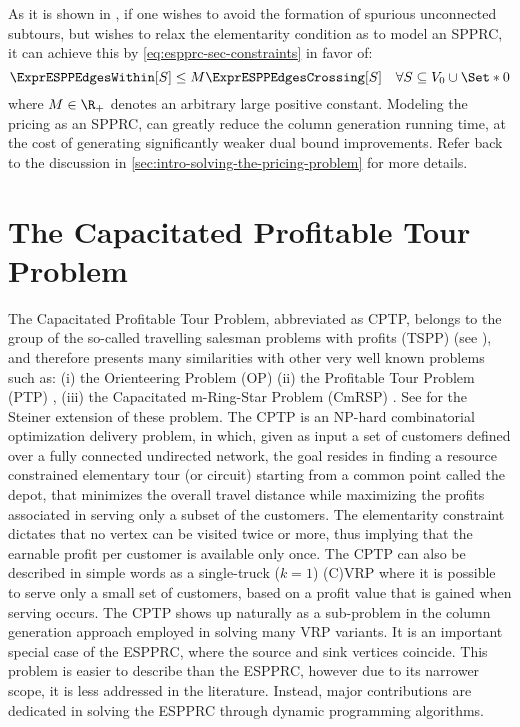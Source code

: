 As it is shown in \textcite{beasley1989},
if one wishes to avoid the formation of spurious unconnected subtours,
but wishes to relax the elementarity condition as to model an SPPRC,
it can achieve this by \cref{eq:espprc-sec-constraints} in favor of:
\begin{equation}
	\ExprESPPEdgesWithin[S] \le M \ExprESPPEdgesCrossing[S] \quad \forall S \subseteq V_0 \cup \Set*{0}
\end{equation}
where $M \in \R_+$ denotes an arbitrary large positive constant.
Modeling the pricing as an SPPRC, can greatly reduce
the column generation running time, at the cost
of generating significantly weaker dual bound improvements.
Refer back to the discussion in \cref{sec:intro-solving-the-pricing-problem}
for more details.

\section{The Capacitated Profitable Tour Problem}
\label{sec:the-capacitated-profitable-tour-problem}

The Capacitated Profitable Tour Problem, abbreviated as CPTP,
belongs to the group of the so-called travelling salesman
problems with profits (TSPP) (see \cite{feillet2005}),
and therefore presents many similarities with other very well known
problems such as:
(i) the Orienteering Problem (OP) \parencite{golden1987, laporte1990}
(ii) the Profitable Tour Problem (PTP) \parencite{dellamico1995},
(iii) the Capacitated m-Ring-Star Problem (CmRSP) \parencite{baldacci2007capacitated}.
See \textcite{letchford2013} for the Steiner extension of these problem.
The CPTP is an NP-hard combinatorial optimization delivery problem,
in which,
given as input a set of customers
defined over a fully connected undirected network, the goal resides in finding
a resource constrained elementary tour (or circuit) starting from a common point called the depot,
that minimizes the overall travel distance while maximizing
the profits associated in serving only a subset of the customers.
The elementarity constraint dictates that no vertex
can be visited twice or more, thus implying that the earnable profit
per customer is available only once.
The CPTP can also be described in simple words
as a single-truck ($k = 1$) (C)VRP where it is possible to serve only a small set of customers,
based on a profit value that is gained when serving occurs.
The CPTP shows up naturally as a sub-problem in the column generation approach employed in solving many VRP variants.
It is an important special case of the ESPPRC, where the source and sink vertices coincide.
This problem is easier to describe than the ESPPRC,
however due to its narrower scope,
it is less addressed in the literature.
Instead, major contributions are dedicated in solving the ESPPRC through dynamic programming algorithms.

